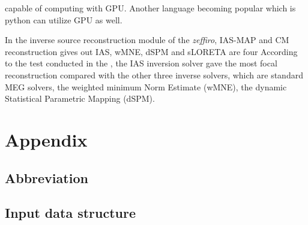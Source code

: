 \documentclass[5p]{elsarticle}
\begin{document}
\begin{frontmatter}
capable of computing with GPU. Another language becoming popular which is python can utilize GPU as well. 
  
In the inverse source reconstruction module of the {\em zeffiro}, IAS-MAP and CM reconstruction gives out   IAS, wMNE, dSPM and sLORETA are four 
According to the test conducted in the \cite{40}, the IAS inversion solver gave the most focal reconstruction compared with the other three inverse solvers, which are standard MEG solvers, the weighted minimum Norm Estimate (wMNE), the dynamic Statistical Parametric Mapping (dSPM).

\section{Appendix}
\subsection{Abbreviation}
\subsection{Input data structure}





\end{frontmatter}
\end{document}
